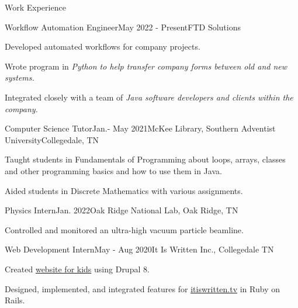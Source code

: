 \begin{rSection}{Work Experience}
	\begin{job}{Workflow Automation Engineer}{May 2022 - Present}{FTD Solutions}{}
		\item Developed automated workflows for company projects.
		\item Wrote program in \em{Python} to help transfer company forms between old and new systems.
		\item Integrated closely with a team of \em{Java} software developers and clients within the company.
	\end{job}
	
	\begin{job}{Computer Science Tutor}{Jan.- May 2021}{McKee Library, Southern Adventist University}{Collegedale, TN}
	 \item Taught students in Fundamentals of Programming about loops, arrays, classes and other programming basics and how to use them in Java.
	 \item Aided students in Discrete Mathematics with various assignments.
	\end{job}

	\begin{job}{Physics Intern}{Jan. 2022}{Oak Ridge National Lab, Oak Ridge, TN}{}
	 \item Controlled and monitored an ultra-high vacuum particle beamline.
	\end{job}

	\begin{job}{Web Development Intern}{May - Aug 2020}{It Is Written Inc., Collegedale TN}{}
		\item Created \href{https://buriedtreasure.fun/}{website for kids} using Drupal 8.
		\item Designed, implemented, and integrated features for \href{itiswritten.tv}{itiswritten.tv} in Ruby on Rails.
	\end{job}
\end{rSection}